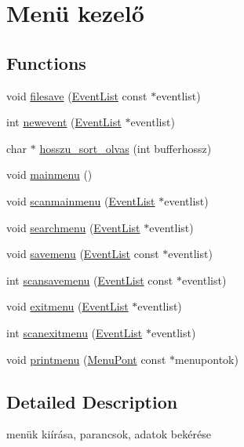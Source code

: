 \hypertarget{group__menu}{}\section{Menü kezelő}
\label{group__menu}
\subsection*{Functions}
\begin{DoxyCompactItemize}
\item 
void \hyperlink{group__menu_ga6ee903116c3ec27e1a4680b08e6647e2}{filesave} (\hyperlink{struct_event_list}{Event\+List} const $\ast$eventlist)
\item 
int \hyperlink{group__menu_ga069c1b762e46bba28b1f38b87d8d58aa}{newevent} (\hyperlink{struct_event_list}{Event\+List} $\ast$eventlist)
\item 
char $\ast$ \hyperlink{group__menu_gab9ac014b764791c1dc71c187dca898f7}{hosszu\+\_\+sort\+\_\+olvas} (int bufferhossz)
\item 
void \hyperlink{group__menu_gac86d3169260f5cacd0f792743957b054}{mainmenu} ()
\item 
void \hyperlink{group__menu_ga8e572ab27981dcd7144340fd25a24c80}{scanmainmenu} (\hyperlink{struct_event_list}{Event\+List} $\ast$eventlist)
\item 
void \hyperlink{group__menu_ga38d64ff02f60ebcb1988655ea12540a6}{searchmenu} (\hyperlink{struct_event_list}{Event\+List} $\ast$eventlist)
\item 
void \hyperlink{group__menu_ga1e8bbce91606e9498fafa46cf96477d0}{savemenu} (\hyperlink{struct_event_list}{Event\+List} const $\ast$eventlist)
\item 
int \hyperlink{group__menu_gadaafbda0a45084d074a4d210ec37efac}{scansavemenu} (\hyperlink{struct_event_list}{Event\+List} const $\ast$eventlist)
\item 
void \hyperlink{group__menu_gac651d3838f4da7bf6055fa839621e289}{exitmenu} (\hyperlink{struct_event_list}{Event\+List} $\ast$eventlist)
\item 
int \hyperlink{group__menu_gaa12eba16d2e2bd5dfc70240d19bd5c8e}{scanexitmenu} (\hyperlink{struct_event_list}{Event\+List} $\ast$eventlist)
\item 
void \hyperlink{group__menu_gac95f6c8c1de4749a4ae8fb342329e6dc}{printmenu} (\hyperlink{struct_menu_pont}{Menu\+Pont} const $\ast$menupontok)
\end{DoxyCompactItemize}


\subsection{Detailed Description}
menük kiírása, parancsok, adatok bekérése 

